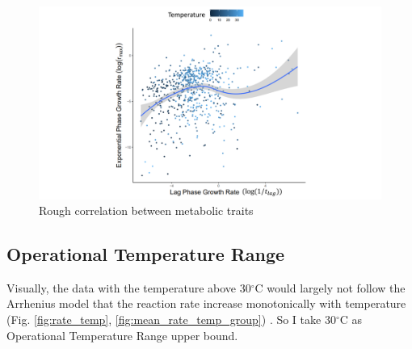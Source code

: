 \documentclass[a4paper]{article}
\begin{document}
\begin{figure}[ht!]
\centering
\includegraphics[width=0.75\linewidth]{Plot/log_rt_col_temp.pdf}
\caption{Rough correlation between metabolic traits}\label{fig:log_rt_col_temp}
\end{figure}

\subsection{Operational Temperature Range}

Visually, the data with the temperature above 30$^{\circ}$C would largely not follow the Arrhenius model that the reaction rate increase monotonically with temperature (Fig. \ref{fig:rate_temp}, \ref{fig:mean_rate_temp_group}) \citep{peleg2012arrhenius}.  So I take 30$^{\circ}$C as Operational Temperature Range upper bound.\\
\end{document}
